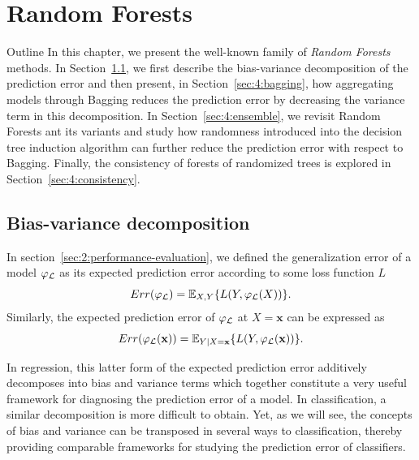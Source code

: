\chapter{Random Forests}\label{ch:forest}

\begin{remark}{Outline}
In this chapter, we present the well-known family of \textit{Random Forests}
methods. In Section~\ref{sec:4:bias-variance}, we first describe the
bias-variance decomposition of the prediction error and then present, in
Section~\ref{sec:4:bagging}, how aggregating models through Bagging reduces the prediction
error by decreasing the variance term in this decomposition. In
Section~\ref{sec:4:ensemble}, we revisit Random Forests ant its variants and
study how randomness introduced into the decision tree induction algorithm can
further reduce the prediction error with respect to Bagging. Finally, the
consistency of forests of randomized trees is explored in
Section~\ref{sec:4:consistency}.
\end{remark}

\section{Bias-variance decomposition}
\label{sec:4:bias-variance}

In section~\ref{sec:2:performance-evaluation}, we defined the generalization
error of a model $\varphi_{\cal L}$ as its expected prediction error
according to some loss function $L$
\begin{equation}
Err(\varphi_{\cal L}) = \mathbb{E}_{X,Y} \{ L(Y, \varphi_{\cal L}(X)) \}.
\end{equation}
Similarly, the expected prediction error of $\varphi_{\cal L}$ at $X=\mathbf{x}$
can be expressed as
\begin{equation}
Err(\varphi_{\cal L}(\mathbf{x})) = \mathbb{E}_{Y|X=\mathbf{x}} \{ L(Y, \varphi_{\cal L}(\mathbf{x})) \}.\label{eqn:4:generalization-error:x}
\end{equation}

In regression, this latter form of the expected prediction error additively
decomposes into bias and variance terms which together constitute a very useful
framework for diagnosing the prediction error of a model. In classification, a
similar decomposition is more difficult to obtain. Yet, as we will see, the
concepts of bias and variance can be transposed in several ways to
classification, thereby providing comparable frameworks for studying the
prediction error of classifiers.

